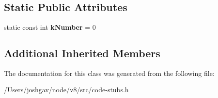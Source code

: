 \subsection*{Static Public Attributes}
\begin{DoxyCompactItemize}
\item 
static const int {\bfseries k\+Number} = 0\hypertarget{classv8_1_1internal_1_1_number_to_string_stub_a4897b2288ccc8b38c203f4dd23bc4725}{}\label{classv8_1_1internal_1_1_number_to_string_stub_a4897b2288ccc8b38c203f4dd23bc4725}

\end{DoxyCompactItemize}
\subsection*{Additional Inherited Members}


The documentation for this class was generated from the following file\+:\begin{DoxyCompactItemize}
\item 
/\+Users/joshgav/node/v8/src/code-\/stubs.\+h\end{DoxyCompactItemize}

